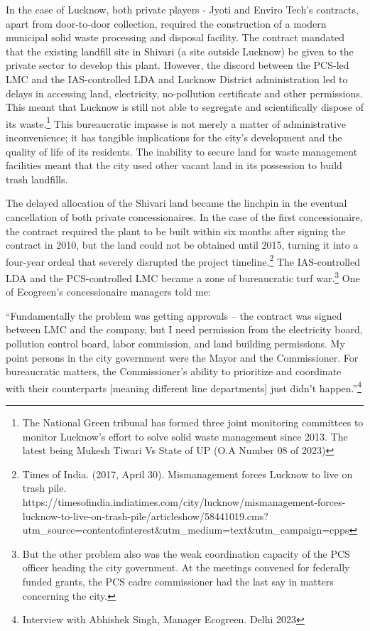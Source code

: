 In the case of Lucknow, both private players - Jyoti and Enviro Tech's contracts, apart from door-to-door collection, required the construction of a modern municipal solid waste processing and disposal facility. The contract mandated that the existing landfill site in Shivari (a site outside Lucknow) be given to the private sector to develop this plant. However, the discord between the PCS-led LMC and the IAS-controlled LDA and Lucknow District administration led to delays in accessing land, electricity, no-pollution certificate and other permissions. This meant that Lucknow is still not able to segregate and scientifically dispose of its waste.\footnote{The National Green tribunal has formed three joint monitoring committees to monitor Lucknow's effort to solve solid waste management since 2013. The latest being Mukesh Tiwari Vs State of UP (O.A Number 08 of 2023)} This bureaucratic impasse is not merely a matter of administrative inconvenience; it has tangible implications for the city's development and the quality of life of its residents. The inability to secure land for waste management facilities meant that the city used other vacant land in its possession to build trash landfills.

The delayed allocation of the Shivari land became the linchpin in the eventual cancellation of both private concessionaires. In the case of the first concessionaire, the contract required the plant to be built within six months after signing the contract in 2010, but the land could not be obtained until 2015, turning it into a four-year ordeal that severely disrupted the project timeline.\footnote{Times of India. (2017, April 30). Mismanagement forces Lucknow to live on trash pile. https://timesofindia.indiatimes.com/city/lucknow/mismanagement-forces-lucknow-to-live-on-trash-pile/articleshow/58441019.cms?utm\_source=contentofinterest\&utm\_medium=text\&utm\_campaign=cpps} The IAS-controlled LDA and the PCS-controlled LMC became a zone of bureaucratic turf war.\footnote{But the other problem also was the weak coordination capacity of the PCS officer heading the city government. At the meetings convened for federally funded grants, the PCS cadre commissioner had the last say in matters concerning the city.} One of Ecogreen's concessionaire managers told me:

``Fundamentally the problem was getting approvals – the contract was signed between LMC and the company, but I need permission from the electricity board, pollution control board, labor commission, and land building permissions. My point persons in the city government were the Mayor and the Commissioner. For bureaucratic matters, the Commissioner's ability to prioritize and coordinate with their counterparts [meaning different line departments] just didn't happen.''\footnote{Interview with Abhishek Singh, Manager Ecogreen. Delhi 2023}

